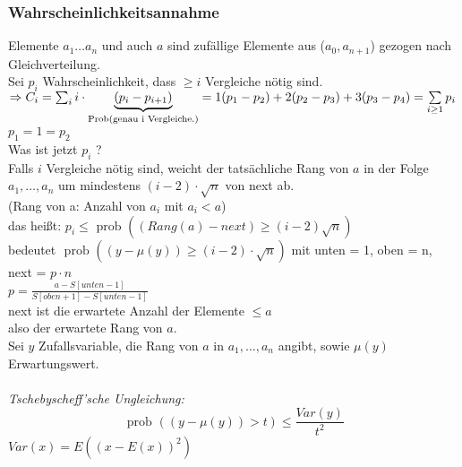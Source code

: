             \subsubsection{Wahrscheinlichkeitsannahme}
                Elemente $a_1 \ldots a_n$ und auch $a$  sind zufällige Elemente aus ($a_0, a_{n+1}$) gezogen nach Gleichverteilung. \\
                Sei $p_i$ Wahrscheinlichkeit, dass $\geq i$ Vergleiche nötig sind. \\
                $\Ra C_i = \sum_i i \cdot  \underbrace{(p_i - p_{i+1})}_{\text{Prob(genau i Vergleiche.)}} 
                		=1(p_1 - p_2) + 2(p_2 - p_3) + 3(p_3-p_4) = \sum \limits_{i \geq 1} p_i$ \\
                \newline
                $p_1 = 1 = p_2$ \\
                Was ist jetzt $p_i$ ? \\
                Falls $i$ Vergleiche nötig sind, weicht der tatsächliche Rang von $a$ in der Folge $a_1 , \ldots, a_n$ um mindestens 
                		$(i-2) \cdot \sqrt{n}$ von next ab. \\
                (Rang von a: Anzahl von $a_i$ mit $a_i < a$) \\
                das heißt: $p_i \leq \text{ prob } ((Rang(a) - next) \geq (i-2) \sqrt{n})$ \\
                bedeutet $\text{ prob } ((y - \mu (y)) \geq (i-2) \cdot \sqrt{n})$ mit unten = 1, oben = n, next = $p \cdot n$ \\
                $p = \frac{a-S[unten -1 ]}{S[oben+1] - S[unten - 1 ]}$\\
                \newline
                next ist die erwartete Anzahl der Elemente $\leq a$ \\
                also der erwartete Rang von $a$. \\
                Sei $y$ Zufallsvariable, die Rang von $a$ in $a_1, \ldots, a_n$ angibt, sowie $\mu(y)$ Erwartungswert. \\\\
                \textit{Tschebyscheff'sche Ungleichung:}
                $$\text{ prob } ((y- \mu (y)) > t) \leq \frac{Var(y)}{t^2}$$
                $Var(x) = E((x-E(x))^{2})$ 
            


